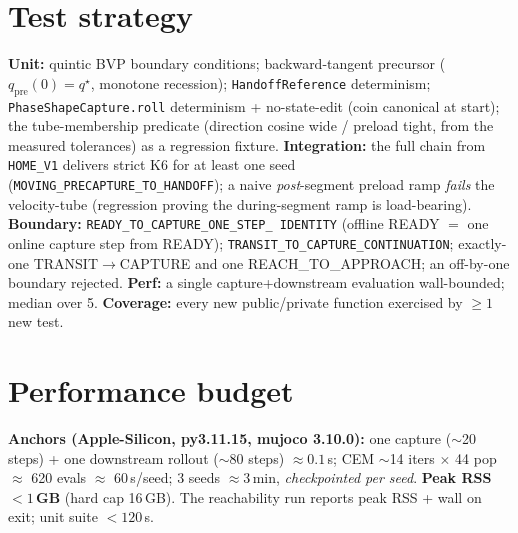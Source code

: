 \documentclass[11pt]{article}
\newcommand{\code}[1]{\texttt{\small #1}}
\begin{document}
\section{Test strategy}
\textbf{Unit:} quintic BVP boundary conditions; backward-tangent precursor ($q_{\mathrm{pre}}(0){=}q^\star$, monotone
recession); \code{HandoffReference} determinism; \code{PhaseShapeCapture.roll} determinism + no-state-edit (coin
canonical at start); the tube-membership predicate (direction cosine wide / preload tight, from the measured tolerances)
as a regression fixture. \textbf{Integration:} the full chain from \code{HOME\_V1} delivers strict K6 for at least one
seed (\code{MOVING\_PRECAPTURE\_TO\_HANDOFF}); a naive \emph{post}-segment preload ramp \emph{fails} the velocity-tube
(regression proving the during-segment ramp is load-bearing). \textbf{Boundary:} \code{READY\_TO\_CAPTURE\_ONE\_STEP\_
IDENTITY} (offline READY $=$ one online capture step from READY); \code{TRANSIT\_TO\_CAPTURE\_CONTINUATION};
exactly-one TRANSIT$\to$CAPTURE and one REACH\_TO\_APPROACH; an off-by-one boundary rejected. \textbf{Perf:} a single
capture+downstream evaluation wall-bounded; median over 5.
\textbf{Coverage:} every new public/private function exercised by $\ge 1$ new test.

\section{Performance budget}
\textbf{Anchors (Apple-Silicon, py3.11.15, mujoco 3.10.0):} one capture ($\sim$20 steps) + one downstream rollout
($\sim$80 steps) $\approx 0.1$\,s; CEM $\sim$14 iters $\times$ 44 pop $\approx$ 620 evals $\approx$ 60\,s/seed;
3 seeds $\approx 3$\,min, \emph{checkpointed per seed}. \textbf{Peak RSS $<1$\,GB} (hard cap 16\,GB). The reachability
run reports peak RSS + wall on exit; unit suite $<120$\,s.
\end{document}
